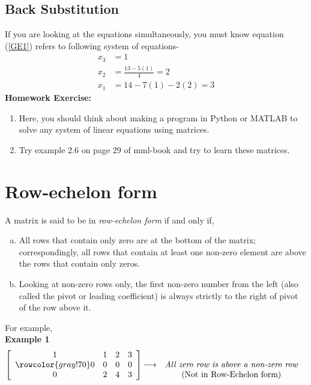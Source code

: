 \documentclass{article}
\begin{document}
\subsection{Back Substitution}
If you are looking at the equations simultaneously, you must know equation (\ref{GE1}) refers to following system of equations-  \\

\begin{equation} \tag{Back Substitution} 
\begin{split}
x_3 &= 1\\
x_2 &= \frac{13 - 5(1)}{4} = 2 \\
x_1 &= 14 - 7(1) - 2(2) = 3
\end{split}
\end{equation}
\textbf{Homework Exercise:}
\begin{enumerate}
    \item Here, you should think about making a program in Python or MATLAB to solve any system of linear equations using matrices.
    \item Try example 2.6 on page 29 of mml-book and try to learn these matrices.
\end{enumerate}


\section{Row-echelon form}
A matrix is said to be in \textit{row-echelon form} if and only if,
\begin{enumerate} [a.]
    \item All rows that contain only zero are at the bottom of the matrix; correspondingly, all rows that contain at least one non-zero element are above the rows that contain only zeros.
    \item Looking at non-zero rows only, the first non-zero number from the left (also called the pivot or leading coefficient) is always strictly to the right of pivot of the row above it.
\end{enumerate}
For example,\\

\textbf{Example 1} 
 \[
 \left[\begin{array}{cccc}
     1 &1 &2 &3\\ 
     \rowcolor{gray!70}
     0 &0 &0 &0\\
     0 &2 &4 &3
  \end{array}\right]
  \begin{matrix}
    & &\\
     \longrightarrow &\emph{All zero row is above a non-zero row}\\
    & \text{(Not in Row-Echelon form)} \nonumber
  \end{matrix}
\]
\end{document}
